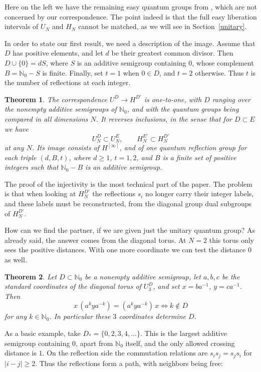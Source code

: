 \documentclass[11pt,a4paper]{article}
\newtheorem{introthm}{Theorem}
\begin{document}
Here on the left we have the remaining easy quantum groups from \cite{cyclic,full}, which are not concerned by our correspondence. The point indeed is that the full easy liberation intervals of $U_N$ and $H_N$ cannot be matched, as we will see in Section~\ref{unitary}.

In order to state our first result, we need a description of the image. Assume that $D$ has positive elements, and let $d$ be their greatest common divisor. Then $D\cup\{0\}=dS$, where $S$ is an additive semigroup containing $0$, whose complement $B=\mathbb N_0-S$ is finite. Finally, set $t=1$ when $0\in D$, and $t=2$ otherwise. Thus $t$ is the number of reflections at each integer.

\begin{introthm}\label{intro-image}
The correspondence $U^D\to H^{D'}$ is one-to-one, with $D$ ranging over the nonempty additive semigroups of $\mathbb N_0$, and with the quantum groups being compared in all dimensions $N$. It reverses inclusions, in the sense that for $D\subset E$ we have
\[
 U_N^D\subset U_N^E,\qquad H_N^{E'}\subset H_N^{D'}
\]
at any $N$. Its image consists of $H^{[\infty]}$, and of one quantum reflection group for each triple $(d,B,t)$, where $d\geq1$, $t=1,2$, and $B$ is a finite set of positive integers such that $\mathbb N_0-B$ is an additive semigroup.
\end{introthm}

The proof of the injectivity is the most technical part of the paper. The problem is that when looking at $H_N^{D'}$ the reflections $s_i$ no longer carry their integer labels, and these labels must be reconstructed, from the diagonal group dual subgroups of $H_N^{D'}$.

How can we find the partner, if we are given just the unitary quantum group? As already said, the answer comes from the diagonal torus. At $N=2$ this torus only sees the positive distances. With one more coordinate we can test the distance $0$ as well.

\begin{introthm}\label{intro-torus}
Let $D\subset\mathbb N_0$ be a nonempty additive semigroup, let $a,b,c$ be the standard coordinates of the diagonal torus of $U_3^D$, and set $x=ba^{-1}$, $y=ca^{-1}$. Then
\[
 x\,(a^kya^{-k})=(a^kya^{-k})\,x\iff k\notin D
\]
for any $k\in\mathbb N_0$. In particular these $3$ coordinates determine $D$.
\end{introthm}

As a basic example, take $D_*=\{0,2,3,4,\ldots\}$. This is the largest additive semigroup containing $0$, apart from $\mathbb N_0$ itself, and the only allowed crossing distance is $1$. On the reflection side the commutation relations are $s_is_j=s_js_i$ for $|i-j|\geq2$. Thus the reflections form a path, with neighbors being free:
\end{document}
